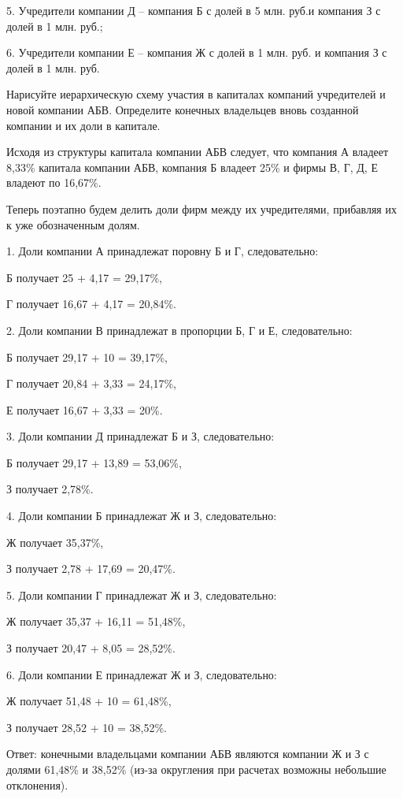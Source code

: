 \documentclass[12pt, table]{exam}
\begin{document}
\begin{questions}
5.	Учредители компании Д – компания Б с долей в 5 млн. руб.и компания З с долей в 1 млн. руб.;

6.	Учредители компании Е – компания Ж с долей в 1 млн. руб. и компания З с долей в 1 млн. руб.

\noaddpoints
\begin{subparts}
\subpart[10] Нарисуйте иерархическую схему участия в капиталах компаний учредителей и новой компании АБВ.
\pagebreak
\subpart[10] Определите конечных владельцев вновь созданной компании и их доли в капитале.

\begin{solution}[35em]
Исходя из структуры капитала компании АБВ следует, что компания А владеет 8,33\% капитала компании АБВ, компания Б владеет 25\% и фирмы В, Г, Д, Е владеют по 16,67\%.

Теперь поэтапно будем делить доли фирм между их учредителями, прибавляя их к уже обозначенным долям.

1.	Доли компании А принадлежат поровну Б и Г, следовательно:

Б получает 25 + 4,17 = 29,17\%,

Г получает 16,67 + 4,17 = 20,84\%.

2. Доли компании В принадлежат в пропорции Б, Г и Е, следовательно:

Б получает 29,17 + 10 = 39,17\%,

Г получает 20,84 + 3,33 = 24,17\%,

Е получает 16,67 + 3,33 = 20\%.

3. Доли компании Д принадлежат Б и З, следовательно:

Б получает 29,17 + 13,89 = 53,06\%,

З получает 2,78\%.

4. Доли компании Б принадлежат Ж и З, следовательно:

Ж получает 35,37\%,

З получает 2,78 + 17,69 = 20,47\%.

5. Доли компании Г принадлежат Ж и З, следовательно:

Ж получает 35,37 + 16,11 = 51,48\%,

З получает 20,47 + 8,05 = 28,52\%.

6. Доли компании Е принадлежат Ж и З, следовательно:

Ж получает 51,48 + 10 = 61,48\%,

З получает 28,52 + 10 = 38,52\%.

Ответ: конечными владельцами компании АБВ являются компании Ж и З с долями 61,48\% и 38,52\% (из-за округления при расчетах возможны небольшие отклонения).
\end{solution}
\end{subparts}
\addpoints

\end{questions}
\end{document}
